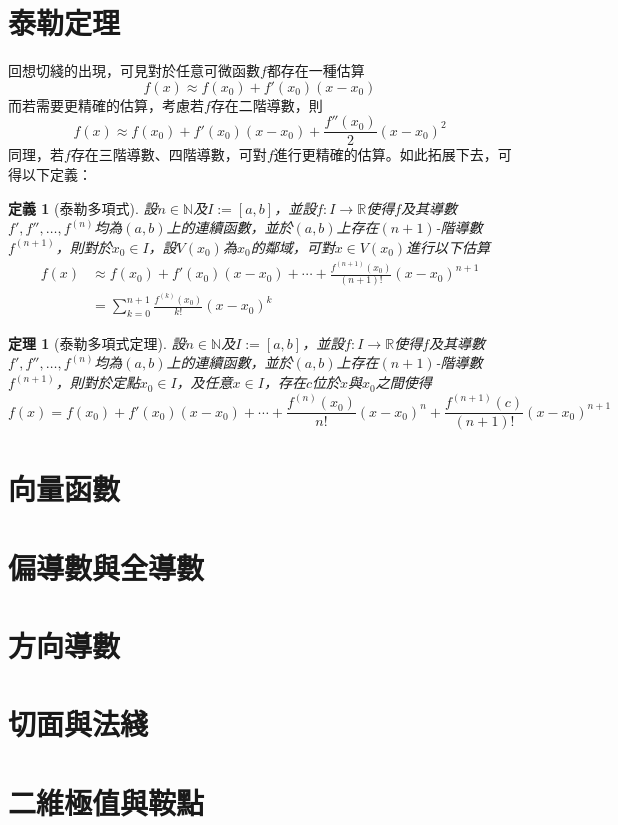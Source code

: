 \documentclass[12pt]{article}
\newtheorem{definition}{定義}
\newtheorem*{theorem}{定理}
\begin{document}
    \section*{泰勒定理}

    回想切綫的出現，可見對於任意可微函數$f$都存在一種估算$$f(x)\approx f(x_0)+f'(x_0)(x-x_0)$$而若需要更精確的估算，考慮若$f$存在二階導數，則$$f(x)\approx f(x_0)+f'(x_0)(x-x_0)+\frac{f''(x_0)}{2}(x-x_0)^2$$同理，若$f$存在三階導數、四階導數，可對$f$進行更精確的估算。如此拓展下去，可得以下定義：

    \begin{definition}[泰勒多項式]
        設$n\in\mathbb{N}$及$I:=[a,b]$，並設$f:I\to\mathbb{R}$使得$f$及其導數$f',f'',\dots,f^{(n)}$均為$(a,b)$上的連續函數，並於$(a,b)$上存在$(n+1)$-階導數$f^{(n+1)}$，則對於$x_0\in I$，設$V(x_0)$為$x_0$的鄰域，可對$x\in V(x_0)$進行以下估算\begin{align*}
            f(x)&\approx f(x_0)+f'(x_0)(x-x_0)+\cdots+\frac{f^{(n+1)}(x_0)}{(n+1)!}(x-x_0)^{n+1}\\
            &=\sum_{k=0}^{n+1}\frac{f^{(k)}(x_0)}{k!}(x-x_0)^k
        \end{align*}
    \end{definition}

    \begin{theorem}[泰勒多項式定理]
        設$n\in\mathbb{N}$及$I:=[a,b]$，並設$f:I\to\mathbb{R}$使得$f$及其導數$f',f'',\dots,f^{(n)}$均為$(a,b)$上的連續函數，並於$(a,b)$上存在$(n+1)$-階導數$f^{(n+1)}$，則對於定點$x_0\in I$，及任意$x\in I$，存在$c$位於$x$與$x_0$之間使得$$f(x)= f(x_0)+f'(x_0)(x-x_0)+\cdots+\frac{f^{(n)}(x_0)}{n!}(x-x_0)^{n}+\frac{f^{(n+1)}(c)}{(n+1)!}(x-x_0)^{n+1}$$
    \end{theorem}
    
    \section*{向量函數}

    \section*{偏導數與全導數}

    \section*{方向導數}

    \section*{切面與法綫}

    \section*{二維極值與鞍點}
\end{document}
